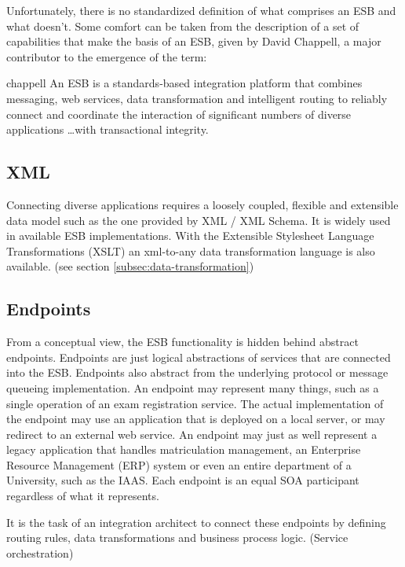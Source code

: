 \newpage
{}
Unfortunately, there is no standardized definition of what comprises an ESB and
what doesn't. Some comfort can be taken from the description of a
set of capabilities that make the basis of an ESB, given by David Chappell, a
major contributor to the emergence of the term: 

\begin{mycite}{chappell}
An ESB is a standards-based integration platform that
combines messaging, web services, data transformation and intelligent routing to
reliably connect and coordinate the interaction of significant numbers of
diverse applications \ldots with transactional integrity.
\end{mycite}

\subsection{XML}
\label{sec:xml}

Connecting diverse applications requires a loosely coupled, flexible and
extensible data model such as the one provided by XML / XML Schema. It is widely
used in available ESB implementations\supercite{chappell}. With the Extensible Stylesheet
Language Transformations (XSLT) an xml-to-any data transformation language is also
available. (see section \ref{subsec:data-transformation})

\subsection{Endpoints}
\label{sec:endpoints}

From a conceptual view, the ESB functionality is hidden behind
abstract endpoints. Endpoints are just logical abstractions of services that are
connected into the ESB. Endpoints also abstract from the underlying protocol or
message queueing implementation. An endpoint may represent many things, such as a
single operation of an exam registration service. The actual implementation of
the endpoint may use an application that is deployed on a local server, or may
redirect to an external web service. An endpoint may just as well represent a
legacy application that handles matriculation management, an Enterprise Resource
Management (ERP) system or even an entire department of a University, such as the
IAAS. Each endpoint is an equal SOA participant regardless of what it
represents.

It is the task of an integration architect to connect these endpoints by
defining routing rules, data transformations and business process logic. (Service
orchestration)

